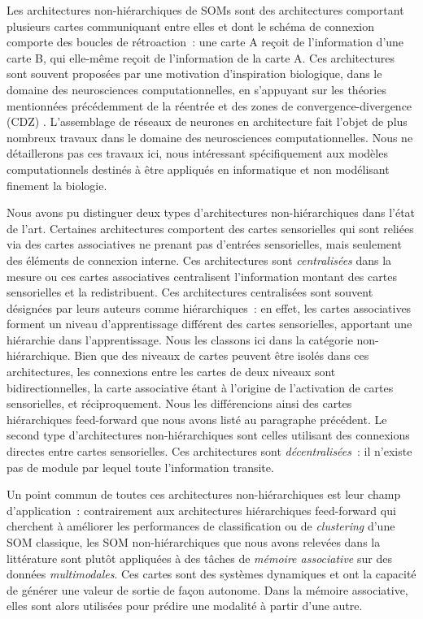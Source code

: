 \documentclass[../main]{subfiles}
\begin{document}
Les architectures non-hiérarchiques de SOMs sont des architectures comportant plusieurs cartes communiquant entre elles et dont le schéma de connexion comporte des boucles de rétroaction~: une carte A reçoit de l'information d'une carte B, qui elle-même reçoit de l'information de la carte A.
Ces architectures sont souvent proposées par une motivation d'inspiration biologique, dans le domaine des neurosciences computationnelles, en s'appuyant sur les théories mentionnées précédemment de la réentrée \cite{Edelman1982GroupSA} et des zones de convergence-divergence (CDZ) \cite{damasio_time-locked_1989}.
L'assemblage de réseaux de neurones en architecture fait l'objet de plus nombreux travaux dans le domaine des neurosciences computationnelles. Nous ne détaillerons pas ces travaux ici, nous intéressant spécifiquement aux modèles computationnels destinés à être appliqués en informatique et non modélisant finement la biologie.

Nous avons pu distinguer deux types d'architectures non-hiérarchiques dans l'état de l'art.
Certaines architectures comportent des cartes sensorielles qui sont reliées via des cartes associatives ne prenant pas d'entrées sensorielles, mais seulement des éléments de connexion interne. Ces architectures sont \emph{centralisées} dans la mesure ou ces cartes associatives centralisent l'information  montant des cartes sensorielles et la redistribuent. Ces architectures centralisées sont souvent désignées par leurs auteurs comme hiérarchiques~: en effet, les cartes associatives forment un niveau d'apprentissage différent des cartes sensorielles, apportant une hiérarchie dans l'apprentissage. Nous les classons ici dans la catégorie non-hiérarchique. Bien que des niveaux de cartes peuvent être isolés dans ces architectures, les connexions entre les cartes de deux niveaux sont bidirectionnelles, la carte associative étant à l'origine de l'activation de cartes sensorielles, et réciproquement.
Nous les différencions ainsi des cartes hiérarchiques feed-forward que nous avons listé au paragraphe précédent.
Le second type d'architectures non-hiérarchiques sont celles utilisant des connexions directes entre cartes sensorielles. Ces architectures sont \emph{décentralisées}~: il n'existe pas de module par lequel toute l'information transite.

Un point commun de toutes ces architectures non-hiérarchiques est leur champ d'application~: contrairement aux architectures hiérarchiques feed-forward qui cherchent à améliorer les performances de classification ou de \emph{clustering} d'une SOM classique, les SOM non-hiérarchiques que nous avons relevées dans la littérature sont plutôt appliquées à des tâches de \emph{mémoire associative} sur des données \emph{multimodales}. Ces cartes sont des systèmes dynamiques et ont la capacité de générer une valeur de sortie de façon autonome. Dans la mémoire associative, elles sont alors utilisées pour prédire une modalité à partir d'une autre.
\end{document}
